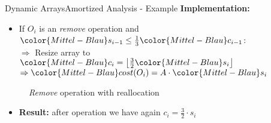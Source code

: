 \begin{frame}{Dynamic Arrays}{Amortized Analysis - Example}
  \textbf{Implementation:}
  \begin{itemize}
    \item
    If {\color{Mittel-Blau}$O_i$} is an \textit{remove} operation and
    ${\color{Mittel-Blau}s_{i-1}}
      \leq \frac{1}{3} {\color{Mittel-Blau}c_{i-1}}$:\\
    $\Rightarrow$ Resize array to
    ${\color{Mittel-Blau}c_i}
      = \left\lfloor\frac{3}{2} {\color{Mittel-Blau}s_i} \right\rfloor$\\
    $\Rightarrow {\color{Mittel-Blau}cost(O_i)}
      = A \cdot {\color{Mittel-Blau}s_i}$
  \end{itemize}
  \begin{figure}[!h]
    \def\FSAsize{15}\def\FSAelements{5}%
    \def\FSAcopy{0}\def\FSAdelete{0}\def\FSAinsert{0}%
    \def\FSAcopyarrow{0}%
    \def\FSAlabelsize{${\color{Mittel-Blau}s_{i-1}} = 5$}%
    \def\FSAlabelcapacity{%
      ${\color{Mittel-Blau}c_{i-1}} = 15%
      \geq {3\cdot\color{Mittel-Blau}s_{i-1}}$}%
    \hspace*{0.5em}\raisebox{2em}{$\Rightarrow$}\hspace*{0.5em}%
    \def\FSAsize{6}\def\FSAelements{0}%
    \def\FSAcopy{4}\def\FSAdelete{1}\def\FSAinsert{0}%
    \def\FSAlabelsize{${\color{Mittel-Blau}s_i}
      = {\color{Mittel-Blau}s_{i-1}- 1} $}%
    \def\FSAlabelcapacity{$6={\color{Mittel-Blau}c_i}
      = \frac{3}{2}{\color{Mittel-Blau}s_i}$ = 4}%
    \caption{\textit{Remove} operation with reallocation}
    \label{fig:dynamic_fields:amortized_analysis:remove}
  \end{figure}
  \begin{itemize}
  \item[] \textbf{Result:} after operation we have again $c_i=\frac{3}{2}\cdot s_i$
  \end{itemize}
\end{frame}


